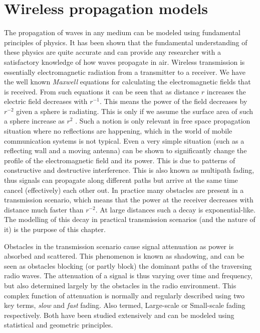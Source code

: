 \chapter{Wireless propagation models}\label{ch:channelmodellingbasics}

The propagation of waves in any medium can be modeled using fundamental principles of physics. It has been shown that the fundamental understanding of these physics are quite accurate and can provide any researcher with a satisfactory knowledge of how waves propagate in air. Wireless transmission is essentially electromagnetic radiation from a transmitter to a receiver. We have the well known \emph{Maxwell} equations for calculating the electromagnetic fields that is received. From such equations it can be seen that as distance $r$ increases the electric field decreases with $r^{-1}$. This means the power of the field decreases by $r^{-2}$ given a sphere is radiating. This is only if we assume the surface area of such a sphere increase as $r^2$ \cite{Tse2005FundamentalsCommunication}. Such a notion is only relevant in free space propagation situation where no reflections are happening, which in the world of mobile communication systems is not typical. Even a very simple situation (such as a reflecting wall and a moving antenna) can be shown to significantly change the profile of the electromagnetic field and its power. This is due to patterns of constructive and destructive interference. This is also known as multipath fading, thus signals can propagate along different paths but arrive at the same time cancel (effectively) each other out. In practice many obstacles are present in a transmission scenario, which means that the power at the receiver decreases with distance much faster than $r^{-2}$. At large distances such a decay is exponential-like. The modelling of this decay in practical transmission scenarios (and the nature of it) is the purpose of this chapter.

Obstacles in the transmission scenario cause signal attenuation as power is absorbed and scattered. This phenomenon is known as shadowing, and can be seen as obstacles blocking (or partly block) the dominant paths of the traversing radio waves. The attenuation of a signal is thus varying over time and frequency, but also determined largely by the obstacles in the radio environment. This complex function of attenuation is normally and regularly described using two key terms, \emph{slow} and \emph{fast} fading. Also termed, Large-scale or Small-scale fading respectively. Both have been studied extensively and can be modeled using statistical and geometric principles.

